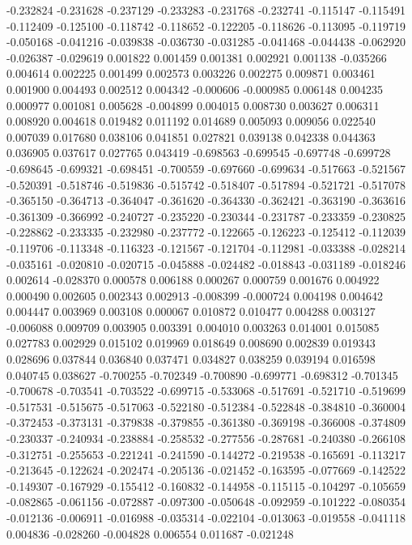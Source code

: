-0.232824
-0.231628
-0.237129
-0.233283
-0.231768
-0.232741
-0.115147
-0.115491
-0.112409
-0.125100
-0.118742
-0.118652
-0.122205
-0.118626
-0.113095
-0.119719
-0.050168
-0.041216
-0.039838
-0.036730
-0.031285
-0.041468
-0.044438
-0.062920
-0.026387
-0.029619
0.001822
0.001459
0.001381
0.002921
0.001138
-0.035266
0.004614
0.002225
0.001499
0.002573
0.003226
0.002275
0.009871
0.003461
0.001900
0.004493
0.002512
0.004342
-0.000606
-0.000985
0.006148
0.004235
0.000977
0.001081
0.005628
-0.004899
0.004015
0.008730
0.003627
0.006311
0.008920
0.004618
0.019482
0.011192
0.014689
0.005093
0.009056
0.022540
0.007039
0.017680
0.038106
0.041851
0.027821
0.039138
0.042338
0.044363
0.036905
0.037617
0.027765
0.043419
-0.698563
-0.699545
-0.697748
-0.699728
-0.698645
-0.699321
-0.698451
-0.700559
-0.697660
-0.699634
-0.517663
-0.521567
-0.520391
-0.518746
-0.519836
-0.515742
-0.518407
-0.517894
-0.521721
-0.517078
-0.365150
-0.364713
-0.364047
-0.361620
-0.364330
-0.362421
-0.363190
-0.363616
-0.361309
-0.366992
-0.240727
-0.235220
-0.230344
-0.231787
-0.233359
-0.230825
-0.228862
-0.233335
-0.232980
-0.237772
-0.122665
-0.126223
-0.125412
-0.112039
-0.119706
-0.113348
-0.116323
-0.121567
-0.121704
-0.112981
-0.033388
-0.028214
-0.035161
-0.020810
-0.020715
-0.045888
-0.024482
-0.018843
-0.031189
-0.018246
0.002614
-0.028370
0.000578
0.006188
0.000267
0.000759
0.001676
0.004922
0.000490
0.002605
0.002343
0.002913
-0.008399
-0.000724
0.004198
0.004642
0.004447
0.003969
0.003108
0.000067
0.010872
0.010477
0.004288
0.003127
-0.006088
0.009709
0.003905
0.003391
0.004010
0.003263
0.014001
0.015085
0.027783
0.002929
0.015102
0.019969
0.018649
0.008690
0.002839
0.019343
0.028696
0.037844
0.036840
0.037471
0.034827
0.038259
0.039194
0.016598
0.040745
0.038627
-0.700255
-0.702349
-0.700890
-0.699771
-0.698312
-0.701345
-0.700678
-0.703541
-0.703522
-0.699715
-0.533068
-0.517691
-0.521710
-0.519699
-0.517531
-0.515675
-0.517063
-0.522180
-0.512384
-0.522848
-0.384810
-0.360004
-0.372453
-0.373131
-0.379838
-0.379855
-0.361380
-0.369198
-0.366008
-0.374809
-0.230337
-0.240934
-0.238884
-0.258532
-0.277556
-0.287681
-0.240380
-0.266108
-0.312751
-0.255653
-0.221241
-0.241590
-0.144272
-0.219538
-0.165691
-0.113217
-0.213645
-0.122624
-0.202474
-0.205136
-0.021452
-0.163595
-0.077669
-0.142522
-0.149307
-0.167929
-0.155412
-0.160832
-0.144958
-0.115115
-0.104297
-0.105659
-0.082865
-0.061156
-0.072887
-0.097300
-0.050648
-0.092959
-0.101222
-0.080354
-0.012136
-0.006911
-0.016988
-0.035314
-0.022104
-0.013063
-0.019558
-0.041118
0.004836
-0.028260
-0.004828
0.006554
0.011687
-0.021248
